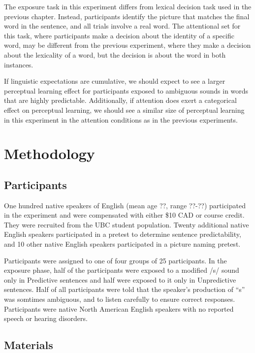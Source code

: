 The exposure task in this experiment differs from lexical decision task used in the previous chapter.  
Instead, participants identify the picture that matches the final word in the sentence, and all trials involve a real word.
The attentional set for this task, where participants make a decision about the identity of a specific word, may be different from the previous experiment, where they make a decision about the lexicality of a word, but the decision is about the word in both instances.

If linguistic expectations are cumulative, we should expect to see a larger perceptual learning effect for participants exposed to ambiguous sounds in words that are highly predictable.
Additionally, if attention does exert a categorical effect on perceptual learning, we should see a similar size of perceptual learning in this experiment in the attention conditions as in the previous experiments.

\section{Methodology}

\subsection{Participants}

One hundred native speakers of English (mean age ??, range ??-??) participated in the experiment and were compensated with either \$10 CAD or course credit. 
They were recruited from the UBC student population.  
Twenty additional native English speakers participated in a pretest to determine sentence predictability, and 10 other native English speakers participated in a picture naming pretest.

Participants were assigned to one of four groups of 25 participants.  
In the exposure phase, half of the participants were exposed to a modified /s/ sound only in Predictive sentences and half were exposed to it only in Unpredictive sentences.  
Half of all participants were told that the speaker's production of ``s'' was somtimes ambiguous, and to listen carefully to ensure correct responses.  
Participants were native North American English speakers with no reported speech or hearing disorders.

\subsection{Materials}

